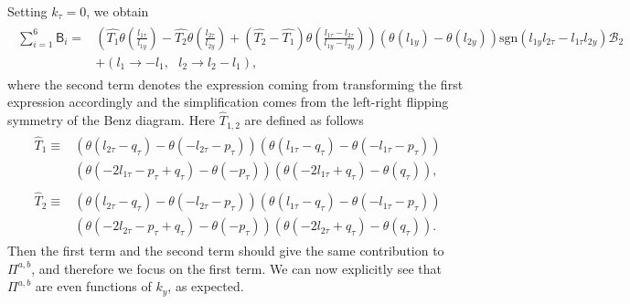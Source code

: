 \documentclass[prx,amsmath,amssymb, notitlepage, onecolumn,
nofootinbib,
superscriptaddress,
longbibliography
]{revtex4-1}
\newcommand{\mc}[1]{\mathcal{#1}}
\newcommand{\beq}{\begin{eqnarray}}
\newcommand{\eeq}{\end{eqnarray}}
\begin{document}
Setting $k_\tau=0$, we obtain
\beq\label{eq: Benz master Equation}
\begin{split}
\sum_{i=1}^6 \mathsf{B}_{i} =& \left(\hat{T_1}\theta\left(\frac{l_{1\tau}}{l_{1y}}\right) - \hat{T_2}\theta\left(\frac{l_{2\tau}}{l_{2y}}\right) + (\hat{T_2}-\hat{T_1})\theta\left(\frac{l_{1\tau}-l_{2\tau}}{l_{1y}-l_{2y}}\right)\right)\left(\theta(l_{1y})-\theta(l_{2y})\right)\text{sgn}\left(l_{1y} l_{2\tau}-l_{1\tau} l_{2y}\right)\mc{B}_{2}\\
&+ \left(l_1\rightarrow - l_1,~~~l_2\rightarrow l_2-l_1\right),
\end{split}
\eeq
where the second term denotes the expression coming from transforming the first expression accordingly and the simplification comes from the left-right flipping symmetry of the Benz diagram. Here $\hat{T}_{1,2}$ are defined as follows
\beq\label{eq: def of T1}
\begin{split}
\hat{T}_1\equiv &\left(\theta(l_{2\tau}-q_\tau)-\theta(-l_{2\tau}-p_\tau)\right)\left(\theta(l_{1\tau}-q_\tau)-\theta(-l_{1\tau}-p_\tau)\right)\\
&\left(\theta(-2l_{1\tau}-p_\tau+q_\tau)-\theta(-p_\tau)\right)\left(\theta(-2l_{1\tau}+q_\tau)-\theta(q_\tau)\right),
\end{split}
\eeq
\beq\label{eq: def of T2}
\begin{split}
\hat{T}_2\equiv &\left(\theta(l_{2\tau}-q_\tau)-\theta(-l_{2\tau}-p_\tau)\right)\left(\theta(l_{1\tau}-q_\tau)-\theta(-l_{1\tau}-p_\tau)\right)\\
&\left(\theta(-2l_{2\tau}-p_\tau+q_\tau)-\theta(-p_\tau)\right)\left(\theta(-2l_{2\tau}+q_\tau)-\theta(q_\tau)\right).
\end{split}
\eeq
Then the first term and the second term should give the same contribution to $\Pi^{a,b}$, and therefore we focus on the first term. We can now explicitly see that $\Pi^{a,b}$ are even functions of $k_y$, as expected.
\end{document}
